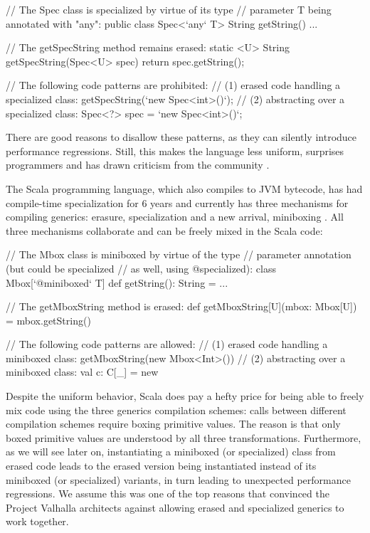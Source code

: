 \begin{lstlisting-nobreak}
// The Spec class is specialized by virtue of its type
// parameter T being annotated with "any":
public class Spec<`any` T> {
  String getString() { ... }
}

// The getSpecString method remains erased:
static <U> String getSpecString(Spec<U> spec) {
  return spec.getString();
}

// The following code patterns are prohibited:
// (1) erased code handling a specialized class:
getSpecString(`new Spec<int>()`);
// (2) abstracting over a specialized class:
Spec<?> spec = `new Spec<int>()`;
\end{lstlisting-nobreak}

There are good reasons to disallow these patterns, as they can silently introduce performance regressions. Still, this makes the language less uniform, surprises programmers and has drawn criticism from the community \cite{king-valhalla-email}.

The Scala programming language, which also compiles to JVM bytecode, has had compile-time specialization for 6 years \cite{iuli-thesis, specialization-iuli} and currently has three mechanisms for compiling generics: erasure, specialization and a new arrival, miniboxing \cite{miniboxing}. All three mechanisms collaborate and can be freely mixed in the Scala code:

\begin{lstlisting-nobreak}
// The Mbox class is miniboxed by virtue of the type
// parameter annotation (but could be specialized
// as well, using @specialized):
class Mbox[`@miniboxed` T] {
  def getString(): String = ...
}

// The getMboxString method is erased:
def getMboxString[U](mbox: Mbox[U]) = mbox.getString()

// The following code patterns are allowed:
// (1) erased code handling a miniboxed class:
getMboxString(new Mbox<Int>())
// (2) abstracting over a miniboxed class:
val c: C[_] = new
\end{lstlisting-nobreak}

Despite the uniform behavior, Scala does pay a hefty price for being able to freely mix code using the three generics compilation schemes: calls between different compilation schemes require boxing primitive values. The reason is that only boxed primitive values are understood by all three transformations. Furthermore, as we will see later on, instantiating a miniboxed (or specialized) class from erased code leads to the erased version being instantiated instead of its miniboxed (or specialized) variants, in turn leading to unexpected performance regressions. We assume this was one of the top reasons that convinced the Project Valhalla architects against allowing erased and specialized generics to work together.

